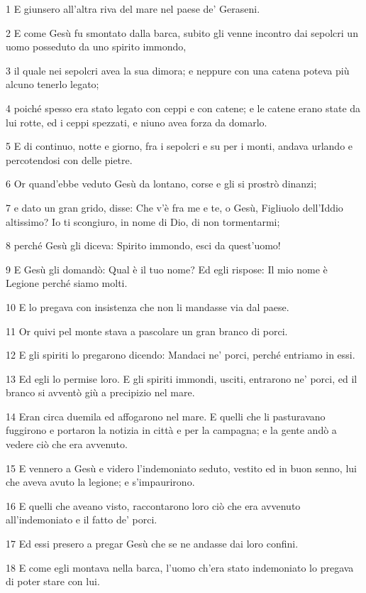 \par 1 E giunsero all'altra riva del mare nel paese de' Geraseni.
\par 2 E come Gesù fu smontato dalla barca, subito gli venne incontro dai sepolcri un uomo posseduto da uno spirito immondo,
\par 3 il quale nei sepolcri avea la sua dimora; e neppure con una catena poteva più alcuno tenerlo legato;
\par 4 poiché spesso era stato legato con ceppi e con catene; e le catene erano state da lui rotte, ed i ceppi spezzati, e niuno avea forza da domarlo.
\par 5 E di continuo, notte e giorno, fra i sepolcri e su per i monti, andava urlando e percotendosi con delle pietre.
\par 6 Or quand'ebbe veduto Gesù da lontano, corse e gli si prostrò dinanzi;
\par 7 e dato un gran grido, disse: Che v'è fra me e te, o Gesù, Figliuolo dell'Iddio altissimo? Io ti scongiuro, in nome di Dio, di non tormentarmi;
\par 8 perché Gesù gli diceva: Spirito immondo, esci da quest'uomo!
\par 9 E Gesù gli domandò: Qual è il tuo nome? Ed egli rispose: Il mio nome è Legione perché siamo molti.
\par 10 E lo pregava con insistenza che non li mandasse via dal paese.
\par 11 Or quivi pel monte stava a pascolare un gran branco di porci.
\par 12 E gli spiriti lo pregarono dicendo: Mandaci ne' porci, perché entriamo in essi.
\par 13 Ed egli lo permise loro. E gli spiriti immondi, usciti, entrarono ne' porci, ed il branco si avventò giù a precipizio nel mare.
\par 14 Eran circa duemila ed affogarono nel mare. E quelli che li pasturavano fuggirono e portaron la notizia in città e per la campagna; e la gente andò a vedere ciò che era avvenuto.
\par 15 E vennero a Gesù e videro l'indemoniato seduto, vestito ed in buon senno, lui che aveva avuto la legione; e s'impaurirono.
\par 16 E quelli che aveano visto, raccontarono loro ciò che era avvenuto all'indemoniato e il fatto de' porci.
\par 17 Ed essi presero a pregar Gesù che se ne andasse dai loro confini.
\par 18 E come egli montava nella barca, l'uomo ch'era stato indemoniato lo pregava di poter stare con lui.
